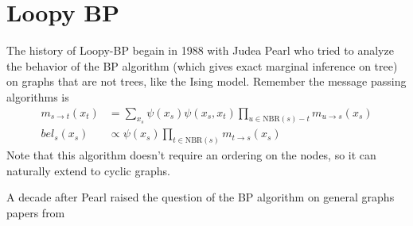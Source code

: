 \documentclass{article}
\begin{document}

\section{Loopy BP}
The history of Loopy-BP begain in 1988 with Judea Pearl who tried to analyze the behavior of the BP algorithm (which gives exact marginal inference on tree) on graphs that are not trees, like the Ising model. Remember the message passing algorithms is
\begin{align*}
	m_{s\to t}(x_t) &= \sum_{x_s}\psi(x_s)\psi(x_s,x_t)\prod_{u\in \text{NBR}(s)-t}m_{u\to s}(x_s)\\
	bel_s(x_s) &\propto \psi(x_s)\prod_{t\in \text{NBR}(s)}m_{t\to s}(x_s)
\end{align*}
Note that this algorithm doesn't require an ordering on the nodes, so it can naturally extend to cyclic graphs.

A decade after Pearl raised the question of the BP algorithm on general graphs papers from 
\end{document}
